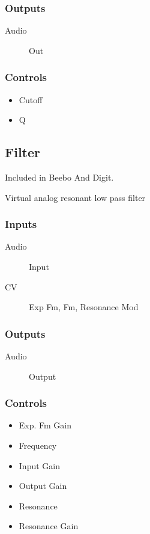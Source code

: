 \subsubsection{Outputs}
\begin{description}
\item [Audio] Out
\end{description}

\subsubsection{Controls}
\begin{itemize}
\item Cutoff
\item Q
\end{itemize}

\subsection{Filter}

Included in Beebo And Digit.

Virtual analog resonant low pass filter



\subsubsection{Inputs}
\begin{description}
\item [Audio] Input
\item [CV] Exp Fm, Fm, Resonance Mod
\end{description}

\subsubsection{Outputs}
\begin{description}
\item [Audio] Output
\end{description}

\subsubsection{Controls}
\begin{itemize}
\item Exp. Fm Gain
\item Frequency
\item Input Gain
\item Output Gain
\item Resonance
\item Resonance Gain
\end{itemize}

